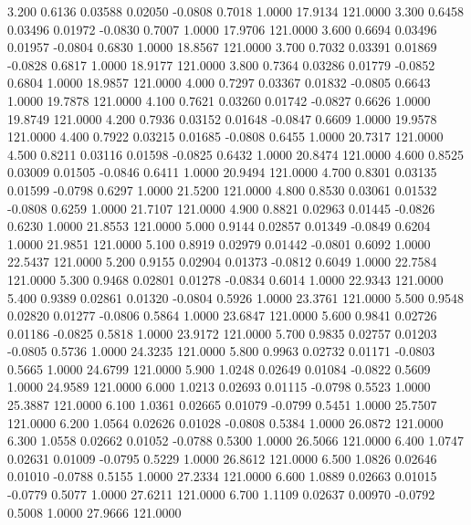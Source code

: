    3.200   0.6136   0.03588   0.02050  -0.0808   0.7018   1.0000  17.9134 121.0000
   3.300   0.6458   0.03496   0.01972  -0.0830   0.7007   1.0000  17.9706 121.0000
   3.600   0.6694   0.03496   0.01957  -0.0804   0.6830   1.0000  18.8567 121.0000
   3.700   0.7032   0.03391   0.01869  -0.0828   0.6817   1.0000  18.9177 121.0000
   3.800   0.7364   0.03286   0.01779  -0.0852   0.6804   1.0000  18.9857 121.0000
   4.000   0.7297   0.03367   0.01832  -0.0805   0.6643   1.0000  19.7878 121.0000
   4.100   0.7621   0.03260   0.01742  -0.0827   0.6626   1.0000  19.8749 121.0000
   4.200   0.7936   0.03152   0.01648  -0.0847   0.6609   1.0000  19.9578 121.0000
   4.400   0.7922   0.03215   0.01685  -0.0808   0.6455   1.0000  20.7317 121.0000
   4.500   0.8211   0.03116   0.01598  -0.0825   0.6432   1.0000  20.8474 121.0000
   4.600   0.8525   0.03009   0.01505  -0.0846   0.6411   1.0000  20.9494 121.0000
   4.700   0.8301   0.03135   0.01599  -0.0798   0.6297   1.0000  21.5200 121.0000
   4.800   0.8530   0.03061   0.01532  -0.0808   0.6259   1.0000  21.7107 121.0000
   4.900   0.8821   0.02963   0.01445  -0.0826   0.6230   1.0000  21.8553 121.0000
   5.000   0.9144   0.02857   0.01349  -0.0849   0.6204   1.0000  21.9851 121.0000
   5.100   0.8919   0.02979   0.01442  -0.0801   0.6092   1.0000  22.5437 121.0000
   5.200   0.9155   0.02904   0.01373  -0.0812   0.6049   1.0000  22.7584 121.0000
   5.300   0.9468   0.02801   0.01278  -0.0834   0.6014   1.0000  22.9343 121.0000
   5.400   0.9389   0.02861   0.01320  -0.0804   0.5926   1.0000  23.3761 121.0000
   5.500   0.9548   0.02820   0.01277  -0.0806   0.5864   1.0000  23.6847 121.0000
   5.600   0.9841   0.02726   0.01186  -0.0825   0.5818   1.0000  23.9172 121.0000
   5.700   0.9835   0.02757   0.01203  -0.0805   0.5736   1.0000  24.3235 121.0000
   5.800   0.9963   0.02732   0.01171  -0.0803   0.5665   1.0000  24.6799 121.0000
   5.900   1.0248   0.02649   0.01084  -0.0822   0.5609   1.0000  24.9589 121.0000
   6.000   1.0213   0.02693   0.01115  -0.0798   0.5523   1.0000  25.3887 121.0000
   6.100   1.0361   0.02665   0.01079  -0.0799   0.5451   1.0000  25.7507 121.0000
   6.200   1.0564   0.02626   0.01028  -0.0808   0.5384   1.0000  26.0872 121.0000
   6.300   1.0558   0.02662   0.01052  -0.0788   0.5300   1.0000  26.5066 121.0000
   6.400   1.0747   0.02631   0.01009  -0.0795   0.5229   1.0000  26.8612 121.0000
   6.500   1.0826   0.02646   0.01010  -0.0788   0.5155   1.0000  27.2334 121.0000
   6.600   1.0889   0.02663   0.01015  -0.0779   0.5077   1.0000  27.6211 121.0000
   6.700   1.1109   0.02637   0.00970  -0.0792   0.5008   1.0000  27.9666 121.0000

